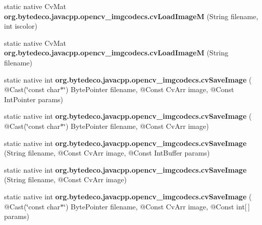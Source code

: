 \begin{DoxyCompactItemize}
\item 
\mbox{\label{group__imgcodecs__c_ga478cdb6034cd33cbd8665f4d3f76de37}} 
static native Cv\+Mat {\bfseries org.\+bytedeco.\+javacpp.\+opencv\+\_\+imgcodecs.\+cv\+Load\+ImageM} (String filename, int iscolor)
\item 
\mbox{\label{group__imgcodecs__c_ga8b23379a14cb1b9d9e5cb6cf0171fb74}} 
static native Cv\+Mat {\bfseries org.\+bytedeco.\+javacpp.\+opencv\+\_\+imgcodecs.\+cv\+Load\+ImageM} (String filename)
\item 
\mbox{\label{group__imgcodecs__c_gaa4c5bb71c3ab371d8389139baed4beb2}} 
static native int {\bfseries org.\+bytedeco.\+javacpp.\+opencv\+\_\+imgcodecs.\+cv\+Save\+Image} ( @Cast(\char`\"{}const char$\ast$\char`\"{}) Byte\+Pointer filename, @Const Cv\+Arr image, @Const Int\+Pointer params)
\item 
\mbox{\label{group__imgcodecs__c_ga6d871fc332ad7b85dc32ed3cef1b9477}} 
static native int {\bfseries org.\+bytedeco.\+javacpp.\+opencv\+\_\+imgcodecs.\+cv\+Save\+Image} ( @Cast(\char`\"{}const char$\ast$\char`\"{}) Byte\+Pointer filename, @Const Cv\+Arr image)
\item 
\mbox{\label{group__imgcodecs__c_gabb5804c3b538782b2d2ecf4c17a58a94}} 
static native int {\bfseries org.\+bytedeco.\+javacpp.\+opencv\+\_\+imgcodecs.\+cv\+Save\+Image} (String filename, @Const Cv\+Arr image, @Const Int\+Buffer params)
\item 
\mbox{\label{group__imgcodecs__c_ga1f8c0c584556d4e3e1c030d162442752}} 
static native int {\bfseries org.\+bytedeco.\+javacpp.\+opencv\+\_\+imgcodecs.\+cv\+Save\+Image} (String filename, @Const Cv\+Arr image)
\item 
\mbox{\label{group__imgcodecs__c_ga844b60e731557fd48c3dc2393d2dc385}} 
static native int {\bfseries org.\+bytedeco.\+javacpp.\+opencv\+\_\+imgcodecs.\+cv\+Save\+Image} ( @Cast(\char`\"{}const char$\ast$\char`\"{}) Byte\+Pointer filename, @Const Cv\+Arr image, @Const int\mbox{[}$\,$\mbox{]} params)
\item 
\mbox{\label{group__imgcodecs__c_ga5ae52c35101c4719cf6f1cae1388f4e1}} 

\end{DoxyCompactItemize}
